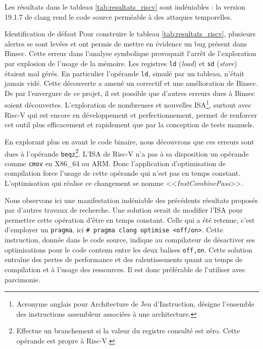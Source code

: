 Les résultats dans le tableau \ref{tab:resultats_riscv} sont indéniables : la version 19.1.7 de clang rend le code source perméable à des attaques temporelles.\medbreak

\begin{CitationBox}{Identification de défaut}
    Pour construire le tableau \ref{tab:resultats_riscv}, plusieurs alertes se sont levées et ont permis de mettre en évidence un bug présent dans Binsec. Cette erreur dans l'analyse symbolique provoquait l'arrêt de l'exploration par explosion de l'usage de la mémoire. Les registres \texttt{ld} (\textit{load}) et \texttt{sd} (\textit{store}) étaient mal gérés. En particulier l'opérande \texttt{ld}, simulé par un tableau, n'était jamais vidé. Cette découverte a amené un correctif et une amélioration de Binsec. De par l'envergure de ce projet, il est possible que d'autres erreurs dues à Binsec soient découvertes. L'exploration de nombreuses et nouvelles ISA\footnote{Acronyme anglais pour Architecture de Jeu d'Instruction, désigne l'ensemble des instructions assembleur associées à une architecture.}, surtout avec Risc-V qui est encore en développement et perfectionnement, permet de renforcer cet outil plus efficacement et rapidement que par la conception de tests manuels.\medbreak
\end{CitationBox}
    
    


En explorant plus en avant le code binaire, nous découvrons que ces erreurs sont dues à l'opérande \texttt{beqz}\footnote{Effectue un branchement si la valeur du registre consulté est zéro. Cette opérande est propre à Risc-V.}. L'ISA de Risc-V n'a pas à sa disposition un opérande comme \texttt{cmov} en X86\_64 ou ARM. Donc l'application d'optimisation de compilation force l'usage de cette opérande qui n'est pas en temps constant. L'optimisation qui réalise ce changement se nomme <<\textit{InstCombinePass}>>.\medbreak

Nous observons ici une manifestation indéniable des précédents résultats proposés par d'autres travaux de recherche. Une solution serait de modifier l'ISA pour permettre cette opération d'être en temps constant. Celle qui a été retenue, c'est d'employer un \texttt{pragma}, ici \texttt{\# pragma clang optimise <off/on>}. Cette instruction, donnée dans le code source, indique au compilateur de désactiver ses optimisations pour le code contenu entre les deux balises \texttt{off,on}. Cette solution entraîne des pertes de performance et des ralentissements quant au temps de compilation et à l'usage des ressources. Il est donc préférable de l'utiliser avec parcimonie.\medbreak

